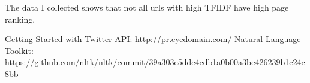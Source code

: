 \documentclass[letterpaper,12pt]{article}
\begin{document}
The data I collected shows that not all urls with high TFIDF have high page ranking. 

\vspace{2mm}
\vspace{5mm}
\vspace{5mm}

\newpage
\newline
\newpage
\vspace*{5pt}

\begin{thebibliography}{9}
\bibitem{} Getting Started with Twitter API: \url{http://pr.eyedomain.com/}
\bibitem{} Natural Language Toolkit: \url{https://github.com/nltk/nltk/commit/39a303e5ddc4cdb1a0b00a3be426239b1c24c8bb}
\end{thebibliography}
\end{document}
